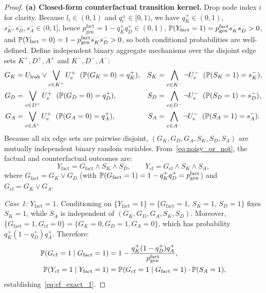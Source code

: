 \begin{proof}
\textbf{(a) Closed-form counterfactual transition kernel.}
Drop node index $i$ for clarity. Because $l_i \in (0, 1)$ and $q_e^\pm \in [0, 1)$, we have $q_K^+ \in (0, 1)$, $s_K^-, s_D^-, s_A^- \in (0, 1]$, hence $p_{\mathrm{gen}}^{\mathrm{fact}} = 1 - q_K^+ q_D^+ \in (0, 1)$, $\mathbb{P}(Y_{\mathrm{fact}}=1) = p_{\mathrm{gen}}^{\mathrm{fact}} s_K^- s_D^- > 0$, and $\mathbb{P}(Y_{\mathrm{fact}}=0) = 1 - p_{\mathrm{gen}}^{\mathrm{fact}} s_K^- s_D^- > 0$, so both conditional probabilities are well-defined. Define independent binary aggregate mechanisms over the disjoint edge sets $K^+, D^+, A^+$ and $K^-, D^-, A^-$:
\begin{align*}
  G_K &= U_{\mathrm{leak}} \lor \bigvee_{e \in K^+} U_e^+ \;\;(\mathbb{P}(G_K = 0) = q_K^+), &
  S_K &= \bigwedge_{e \in K^-} \neg U_e^- \;\;(\mathbb{P}(S_K = 1) = s_K^-),\\
  G_D &= \bigvee_{e \in D^+} U_e^+ \;\;(\mathbb{P}(G_D = 0) = q_D^+), &
  S_D &= \bigwedge_{e \in D^-} \neg U_e^- \;\;(\mathbb{P}(S_D = 1) = s_D^-),\\
  G_A &= \bigvee_{e \in A^+} U_e^+ \;\;(\mathbb{P}(G_A = 0) = q_A^+), &
  S_A &= \bigwedge_{e \in A^-} \neg U_e^- \;\;(\mathbb{P}(S_A = 1) = s_A^-).
\end{align*}
Because all six edge sets are pairwise disjoint, $(G_K, G_D, G_A, S_K, S_D, S_A)$ are mutually independent binary random variables. From~\eqref{eq:noisy_or_not}, the factual and counterfactual outcomes are:
\[
  Y_{\mathrm{fact}} = G_{\mathrm{fact}} \land S_K \land S_D, \qquad
  Y_{\mathrm{cf}} = G_{\mathrm{cf}} \land S_K \land S_A,
\]
where $G_{\mathrm{fact}} = G_K \lor G_D$ (with $\mathbb{P}(G_{\mathrm{fact}} = 1) = 1 - q_K^+ q_D^+ = p_{\mathrm{gen}}^{\mathrm{fact}}$) and $G_{\mathrm{cf}} = G_K \lor G_A$.

\emph{Case 1: $Y_{\mathrm{fact}} = 1$.} Conditioning on $\{Y_{\mathrm{fact}} = 1\} = \{G_{\mathrm{fact}} = 1,\, S_K = 1,\, S_D = 1\}$ fixes $S_K = 1$, while $S_A$ is independent of $(G_K, G_D, G_A, S_K, S_D)$. Moreover, $\{G_{\mathrm{fact}}=1, G_{\mathrm{cf}}=0\} = \{G_K=0, G_D=1, G_A=0\}$, which has probability $q_K^+(1 - q_D^+) q_A^+$. Therefore:
\begin{align*}
  \mathbb{P}(G_{\mathrm{cf}}=1 \mid G_{\mathrm{fact}}=1) &= 1 - \frac{q_K^+(1 - q_D^+) q_A^+}{p_{\mathrm{gen}}^{\mathrm{fact}}},\\
  \mathbb{P}(Y_{\mathrm{cf}}=1 \mid Y_{\mathrm{fact}}=1) &= \mathbb{P}(G_{\mathrm{cf}}=1 \mid G_{\mathrm{fact}}=1) \cdot \mathbb{P}(S_A = 1),
\end{align*}
establishing~\eqref{eq:cf_exact_1}.


\end{proof}
